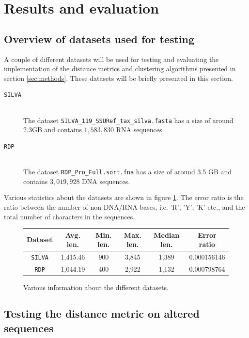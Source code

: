 \section{Results and evaluation} \label{sec:results}

\subsection{Overview of datasets used for testing}
\label{sec:overview_of_datasets}

A couple of different datasets will be used for testing and evaluating the
implementation of the distance metrics and clustering algorithms presented in
section \ref{sec:methods}. These datasets will be briefly presented in this
section.

\begin{description}
  \item[\texttt{SILVA}] \hfill \\
    The dataset \texttt{SILVA\_119\_SSURef\_tax\_silva.fasta} has a size of
    around 2.3GB and contains $1,583,830$ RNA sequences.

  \item[\texttt{RDP}] \hfill \\
    The dataset \texttt{RDP\_Pro\_Full.sort.fna} has a size of around 3.5 GB
    and contains $3,019,928$ DNA sequences.
\end{description}

Various statistics about the datasets are shown in figure \ref{fig:data_stats}.
The error ratio is the ratio between the number of non DNA/RNA bases, i.e. 'R',
'Y', 'K' etc., and the total number of characters in the sequences.

\begin{figure}[H]
  \centering
  \begin{tabular}{c |  c | c | c | c | c}
    Dataset        & Avg. len. & Min. len. & Max. len. & Median len. & Error ratio \\
    \hline
    \texttt{SILVA} & 1,415.46  & 900       & 3,845     & 1,389       & 0.000156146 \\
    \texttt{RDP}   & 1,044.19  & 400       & 2,922     & 1,132       & 0.000798764 \\
  \end{tabular}
  \caption{Various information about the different datasets.}
  \label{fig:data_stats}
\end{figure}


\subsection{Testing the distance metric on altered sequences}
\label{sec:altered_sequences}

